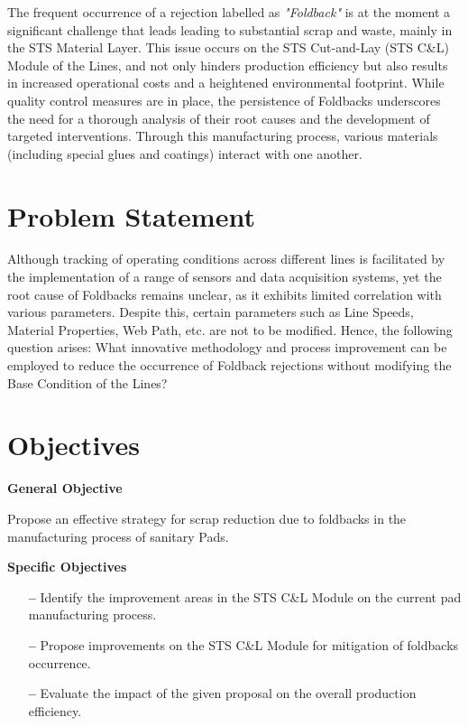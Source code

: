 The frequent occurrence of a rejection labelled as \textit{"Foldback"} is at the moment a significant challenge that leads leading to substantial scrap and waste, mainly in the STS Material Layer. This issue occurs on the STS Cut-and-Lay (STS C\&L) Module of the Lines, and not only hinders production efficiency but also results in increased operational costs and a heightened environmental footprint. While quality control measures are in place, the persistence of Foldbacks underscores the need for a thorough analysis of their root causes and the development of targeted interventions. Through this manufacturing process, various materials (including special glues and coatings) interact with one another. 
\section{Problem Statement}
%
Although tracking of operating conditions across different lines is facilitated by the implementation of a range of sensors and data acquisition systems, yet the root cause of Foldbacks remains unclear, as it exhibits limited correlation with various parameters. Despite this, certain parameters such as Line Speeds, Material Properties, Web Path, etc. are not to be modified. Hence, the following question arises: What innovative methodology and process improvement can be employed to reduce the occurrence of Foldback rejections without modifying the Base Condition of the Lines?
\section{Objectives}

\textbf{General Objective}

Propose an effective strategy for scrap reduction due to foldbacks in the manufacturing process of sanitary Pads.

\textbf{Specific Objectives}

\begin{itemize}
    \item[\textbf{--}]  Identify the improvement areas in the STS C\&L Module on the current pad manufacturing process.
    \item[\textbf{--}]  Propose improvements on the STS C\&L Module for mitigation of foldbacks occurrence.
    \item[\textbf{--}] Evaluate the impact of the given proposal on the overall production efficiency. %
\end{itemize}

